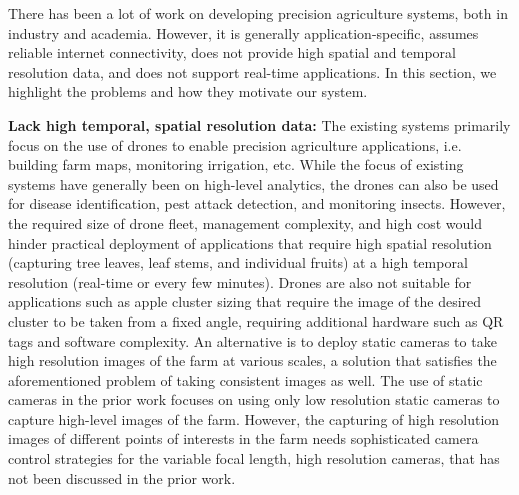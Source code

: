 There has been a lot of work on developing precision agriculture systems, both in industry and academia. 
However, it is generally application-specific, assumes reliable internet connectivity, does not provide high spatial and temporal resolution data, and does not support real-time applications. 
In this section, we highlight the problems and how they motivate our system. 

\noindent
\textbf{Lack high temporal, spatial resolution data:}
The existing systems primarily focus on the use of drones to enable precision agriculture applications, i.e. building farm maps, monitoring irrigation, etc. While the focus of existing systems have generally been on high-level analytics, the drones can also be used for disease identification, pest attack detection, and monitoring insects. 
However, the required size of drone fleet, management complexity, and high cost would hinder practical deployment of applications that require high spatial resolution (capturing tree leaves, leaf stems, and individual fruits) at a high temporal resolution (real-time or every few minutes). 
Drones are also not suitable for applications such as apple cluster sizing that require the image of the desired cluster to be taken from a fixed angle, requiring additional hardware such as QR tags and software complexity. 
An alternative is to deploy static cameras to take high resolution images of the farm at various scales, a solution that satisfies the aforementioned problem of taking consistent images as well. 
The use of static cameras in the prior work focuses on using only low resolution static cameras to capture high-level images of the farm.
However, the capturing of high resolution images of different points of interests in the farm needs sophisticated camera control strategies for the variable focal length, high resolution cameras, that has not been discussed in the prior work. 





